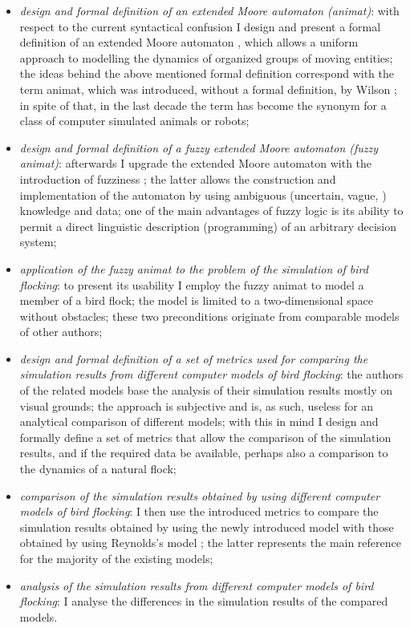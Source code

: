 \begin{itemize}
\item \emph{design and formal definition of an extended Moore automaton (animat)}:
with respect to the current syntactical confusion I design and present a formal definition of an extended Moore automaton \cite{kohavi:1978}, which allows a uniform approach to modelling the dynamics of organized groups of moving entities; the ideas behind the above mentioned formal definition correspond with the term animat, which was introduced, without a formal definition, by Wilson \cite{wilson:1985}; in spite of that, in the last decade the term has become the synonym for a class of computer simulated animals or robots;
\item \emph{design and formal definition of a fuzzy extended Moore automaton (fuzzy animat)}:
afterwards I upgrade the extended Moore automaton with the introduction of fuzziness \cite{zadeh:1965}; the latter allows the construction and implementation of the automaton by using ambiguous (uncertain, vague, \etc) knowledge and data; one of the main advantages of fuzzy logic is its ability to permit a direct linguistic description (programming) of an arbitrary decision system;
\item \emph{application of the fuzzy animat to the problem of the simulation of bird flocking}:
to present its usability I employ the fuzzy animat to model a member of a bird flock; the model is limited to a two-dimensional space without obstacles; these two preconditions originate from comparable models of other authors; 
\item \emph{design and formal definition of a set of metrics used for comparing the simulation results from different computer models of bird flocking}:
the authors of the related models base the analysis of their simulation results mostly on visual grounds; the approach is subjective and is, as such, useless for an analytical comparison of different models; with this in mind I design and formally define a set of metrics that allow the comparison of the simulation results, and if the required data be available, perhaps also a comparison to the dynamics of a natural flock;
\item \emph{comparison of the simulation results obtained by using different computer models of bird flocking}:
I then use the introduced metrics to compare the simulation results obtained by using the newly introduced model with those obtained by using Reynolds's model \cite{reynolds:1987,reynolds:1999}; the latter represents the main reference for the majority of the existing models;
\item \emph{analysis of the simulation results from different computer models of bird flocking}:
I analyse the differences in the simulation results of the compared models. 
\end{itemize}


